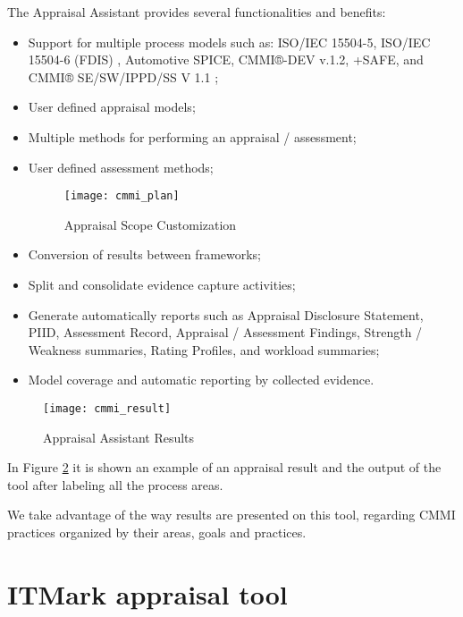 The Appraisal Assistant provides several functionalities and benefits:
\begin{itemize}
	\item Support for multiple process models such as: ISO/IEC 15504-5, ISO/IEC 15504-6 (FDIS) \citep{rout2003iso}, Automotive SPICE, CMMI®-DEV v.1.2, +SAFE, and CMMI® SE/SW/IPPD/SS V 1.1 \citep{team2002capability};
	\item User defined appraisal models;
	\item Multiple methods for performing an appraisal / assessment;
	\item User defined assessment methods;
	\begin{figure}[h]
		\begin{center}
			\leavevmode
			\texttt{[image: cmmi\_plan]}
			\caption{Appraisal Scope Customization}
			\label{fig:cmmi_plan}
		\end{center}
	\end{figure}
	\item Conversion of results between frameworks;
	\item Split and consolidate evidence capture activities;
	\item Generate automatically reports such as Appraisal Disclosure Statement, PIID, Assessment Record, Appraisal / Assessment Findings, Strength / Weakness summaries, Rating Profiles, and workload summaries;
	\item Model coverage and automatic reporting by collected evidence.
\end{itemize}


\begin{figure}[h]
	\begin{center}
		\leavevmode
		\texttt{[image: cmmi\_result]}
		\caption{Appraisal Assistant Results}
		\label{fig:cmmi_result}
	\end{center}
\end{figure}

In Figure \ref{fig:cmmi_result} it is shown an example of an appraisal result and the output of the tool after labeling all the process areas.

We take advantage of the way results are presented on this tool, regarding CMMI practices organized by their areas, goals and practices.
\newpage


\section{ITMark appraisal tool}\label{itmarktool}

